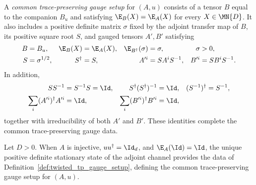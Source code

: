 \begin{definition}
    \label{def:twisted_tp_gauge_setup}
    \leanok
    A \emph{common trace-preserving gauge setup} for $(A,u)$ consists of a
    tensor $B$ equal to the companion $B_u$ and satisfying
    $\E_B(X)=\E_A(X)$ for every $X\in\MN{D}$. It also includes a positive
    definite matrix $\sigma$ fixed by the adjoint transfer map of $B$, its
    positive square root $S$, and gauged tensors $A',B'$ satisfying
    \begin{align}
        B & =B_u,
          & \E_B(X)                & =\E_A(X),
          & \E_{B^\dagger}(\sigma) & =\sigma,
          & \sigma                 & >0,          \\
        S & =\sigma^{1/2},
          & S^\dagger              & =S,
          & A'^i                   & =SA^iS^{-1},
          & B'^i                   & =SB^iS^{-1}.
        \notag
    \end{align}
    In addition,
    \begin{align}
        SS^{-1}                   & =S^{-1}S=\Id,
                                  & S^\dagger(S^\dagger)^{-1} & =\Id,
                                  & (S^{-1})^\dagger          & =S^{-1}, \\
        \sum_i(A'^i)^\dagger A'^i & =\Id,
                                  & \sum_i(B'^i)^\dagger B'^i & =\Id,
        \notag
    \end{align}
    together with irreducibility of both $A'$ and $B'$. These identities
    complete the common trace-preserving gauge data.
\end{definition}

\begin{definition}
    \label{def:twisted_tp_gauge_setup_construction}
    \leanok
    Let $D>0$. When $A$ is injective, $uu^\dagger=\Id_d$, and
    $\E_A(\Id)=\Id$, the unique positive definite stationary state of the
    adjoint channel provides the data of
    Definition~\ref{def:twisted_tp_gauge_setup}, defining the common
    trace-preserving gauge setup for $(A,u)$.
\end{definition}


